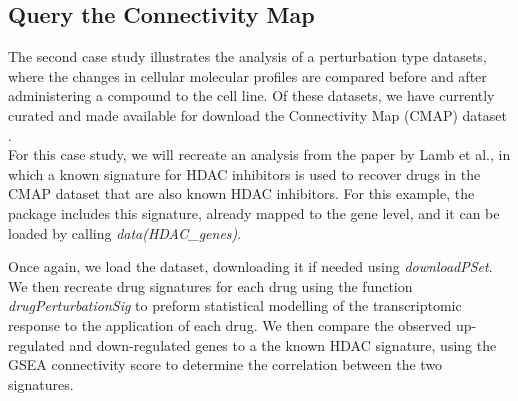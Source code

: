 \documentclass[11pt]{article}
\begin{document}
\subsection{Query the Connectivity Map}

The second case study illustrates the analysis of a perturbation type datasets, where the changes in cellular molecular profiles are compared before and after administering a compound to the cell line. Of these datasets, we have currently curated and made available for download the Connectivity Map (CMAP) dataset \cite{lamb_connectivity_2006}. \\

For this case study, we will recreate an analysis from the paper by Lamb et al., in which a known signature for HDAC inhibitors \cite{glaser_gene_2003} is used to recover drugs in the CMAP dataset that are also known HDAC inhibitors. For this example, the package includes this signature, already mapped to the gene level, and it can be loaded by calling \textit{data(HDAC\_genes)}.

Once again, we load the dataset, downloading it if needed using \textit{downloadPSet}. We then recreate drug signatures for each drug using the function \textit{drugPerturbationSig} to preform statistical modelling of the transcriptomic response to the application of each drug. We then compare the observed up-regulated and down-regulated genes to a the known HDAC signature, using the GSEA connectivity score to determine the correlation between the two signatures. 
\end{document}

